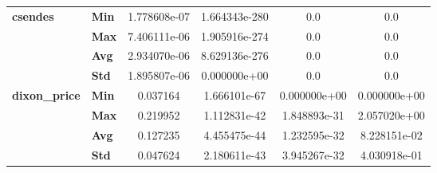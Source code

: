 \begin{longtable}{llcccc}
\cline{1-6}
\multirow{4}{*}{\textbf{csendes}} & \textbf{Min} &  1.778608e-07 &  1.664343e-280 &     0.0 &  0.0 \\
        & \textbf{Max} &  7.406111e-06 &  1.905916e-274 &     0.0 &  0.0 \\
        & \textbf{Avg} &  2.934070e-06 &  8.629136e-276 &     0.0 &  0.0 \\
        & \textbf{Std} &  1.895807e-06 &   0.000000e+00 &     0.0 &  0.0 \\
\cline{1-6}
\multirow{4}{*}{\textbf{dixon_price}} & \textbf{Min} &     0.037164 &   1.666101e-67 &  0.000000e+00 &   0.000000e+00 \\
            & \textbf{Max} &     0.219952 &   1.112831e-42 &  1.848893e-31 &   2.057020e+00 \\
            & \textbf{Avg} &     0.127235 &   4.455475e-44 &  1.232595e-32 &   8.228151e-02 \\
            & \textbf{Std} &     0.047624 &   2.180611e-43 &  3.945267e-32 &   4.030918e-01 \\
\end{longtable}
